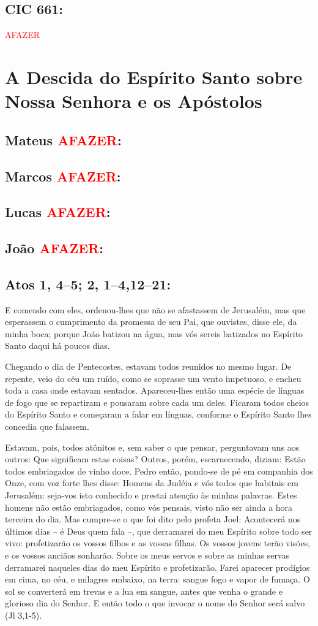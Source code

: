 \documentclass[10pt,a5paper]{book}
\newcommand{\from}[1]{\subsection*{#1}}
\newcommand{\TODO}{\textcolor{red}{\ttfamily AFAZER}}
\begin{document}
\from{CIC 661:}

\TODO


\section{A Descida do Espírito Santo sobre Nossa Senhora e os Apóstolos}

\from{Mateus \TODO:}

\from{Marcos \TODO:}

\from{Lucas \TODO:}

\from{João \TODO:}

\from{Atos 1, 4--5; 2, 1--4,12--21:}

E comendo com eles, ordenou-lhes que não se afastassem de Jerusalém, mas que esperassem o cumprimento da promessa de seu Pai, que ouvistes, disse ele, da minha boca;
porque João batizou na água, mas vós sereis batizados no Espírito Santo daqui há poucos dias.

Chegando o dia de Pentecostes, estavam todos reunidos no mesmo lugar.
De repente, veio do céu um ruído, como se soprasse um vento impetuoso, e encheu toda a casa onde estavam sentados.
Apareceu-lhes então uma espécie de línguas de fogo que se repartiram e pousaram sobre cada um deles.
Ficaram todos cheios do Espírito Santo e começaram a falar em línguas, conforme o Espírito Santo lhes concedia que falassem.

Estavam, pois, todos atônitos e, sem saber o que pensar, perguntavam uns aos outros:
Que significam estas coisas?
Outros, porém, escarnecendo, diziam:
Estão todos embriagados de vinho doce.
Pedro então, pondo-se de pé em companhia dos Onze, com voz forte lhes disse:
Homens da Judéia e vós todos que habitais em Jerusalém:
seja-vos isto conhecido e prestai atenção às minhas palavras.
Estes homens não estão embriagados, como vós pensais, visto não ser ainda a hora terceira do dia.
Mas cumpre-se o que foi dito pelo profeta Joel:
Acontecerá nos últimos dias -- é Deus quem fala --, que derramarei do meu Espírito sobre todo ser vivo:
profetizarão os vossos filhos e as vossas filhas.
Os vossos jovens terão visões, e os vossos anciãos sonharão.
Sobre os meus servos e sobre as minhas servas derramarei naqueles dias do meu Espírito e profetizarão.
Farei aparecer prodígios em cima, no céu, e milagres embaixo, na terra:
sangue fogo e vapor de fumaça.
O sol se converterá em trevas e a lua em sangue, antes que venha o grande e glorioso dia do Senhor.
E então todo o que invocar o nome do Senhor será salvo (Jl 3,1-5).
\end{document}
